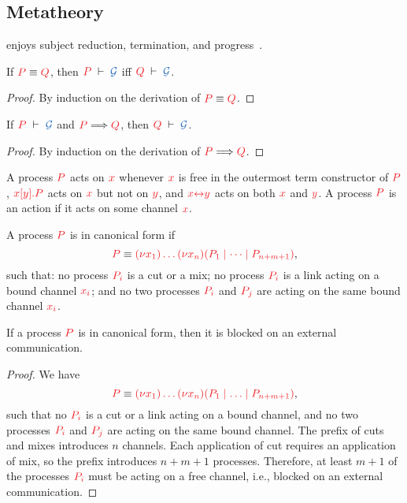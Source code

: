 \documentclass[UKenglish]{llncs}
\begin{document}
\subsection{Metatheory}
\label{sec:cp-metatheory}
\hcp enjoys subject reduction, termination, and progress~\citep{kokke2018tlla}.
\begin{lemma}\label{lem:hcp-preservation-equiv}
  If $\tm{P}\equiv\tm{Q}$, then $\seq[P]{\mathcal{G}}$ iff $\seq[Q]{\mathcal{G}}$.
\end{lemma} 
\begin{proof}
  By induction on the derivation of $\tm{P}\equiv\tm{Q}$.
\end{proof}
\begin{theorem}[Preservation]\label{thm:hcp-preservation}
  If $\seq[P]{\mathcal{G}}$ and $\reducesto{P}{Q}$, then $\seq[Q]{\mathcal{G}}$.
\end{theorem} 
\begin{proof}
  By induction on the derivation of $\reducesto{P}{Q}$.
\end{proof}
\begin{definition}[Actions]
  A process $\tm{P}$ acts on $\tm{x}$ whenever $\tm{x}$ is free in the outermost
  term constructor of $\tm{P}$, \eg $\tm{\piSend{x}{y}{P}}$ acts on $\tm{x}$
  but not on $\tm{y}$, and $\tm{\cpLink{x}{y}}$ acts on both $\tm{x}$ and $\tm{y}$.
  A process $\tm{P}$ is an action if it acts on some channel $\tm{x}$.
\end{definition}
\begin{definition}\label{def:hcp-canonical-forms}
  A process $\tm{P}$ is in canonical form if
  \[
  \tm{P} \equiv \tm{\piNew{x_1}{\dots\piNew{x_n}{(P_1 \mid \dots \mid P_{n+m+1})}}},
  \]
  such that: no process $\tm{P_i}$ is a cut or a mix; no process $\tm{P_i}$ is a link acting on a bound channel $\tm{x_i}$; and no two processes $\tm{P_i}$ and $\tm{P_j}$ are acting on the same bound channel $\tm{x_i}$.
\end{definition}
\begin{corollary}
  If a process $\tm{P}$ is in canonical form, then it is blocked on an external communication.
\end{corollary}
\begin{proof}
  We have
  \[
  \tm{P} \equiv \tm{\piNew{x_1}{\dots\piNew{x_n}{(P_1 \ppar \dots \ppar P_{n+m+1})}}},
  \]
  such that no $\tm{P_i}$ is a cut or a link acting on a bound channel, and no two processes $\tm{P_i}$ and $\tm{P_j}$ are acting on the same bound channel. The prefix of cuts and mixes introduces $n$ channels. Each application of cut requires an application of mix, so the prefix introduces $n+m+1$ processes. Therefore, at least $m+1$ of the processes $\tm{P_i}$ must be acting on a free channel, i.e., blocked on an external communication.
\end{proof}
\end{document}
